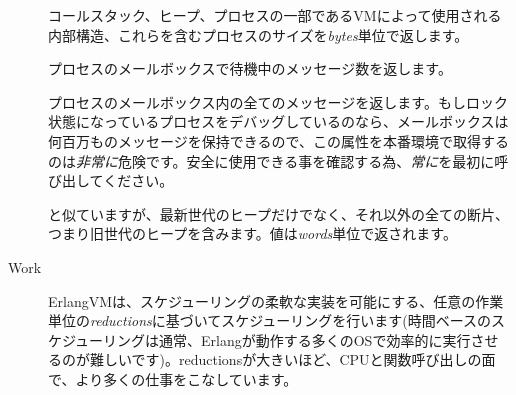 \begin{description*}
\begin{description}
			\item[] コールスタック、ヒープ、プロセスの一部であるVMによって使用される内部構造、これらを含むプロセスのサイズを\emph{bytes}単位で返します。

			\item[] プロセスのメールボックスで待機中のメッセージ数を返します。

			\item[] プロセスのメールボックス内の全てのメッセージを返します。もしロック状態になっているプロセスをデバッグしているのなら、メールボックスは何百万ものメッセージを保持できるので、この属性を本番環境で取得するのは\emph{非常に}危険です。安全に使用できる事を確認する為、\emph{常に}を最初に呼び出してください。

			\item[] と似ていますが、最新世代のヒープだけでなく、それ以外の全ての断片、つまり旧世代のヒープを含みます。値は\emph{words}単位で返されます。
			\end{description}
	\item[Work] \hfill
		\begin{description}
			\item[] ErlangVMは、スケジューリングの柔軟な実装を可能にする、任意の作業単位の\emph{reductions}に基づいてスケジューリングを行います(時間ベースのスケジューリングは通常、Erlangが動作する多くのOSで効率的に実行させるのが難しいです)。reductionsが大きいほど、CPUと関数呼び出しの面で、より多くの仕事をこなしています。
		\end{description}
\end{description*}

